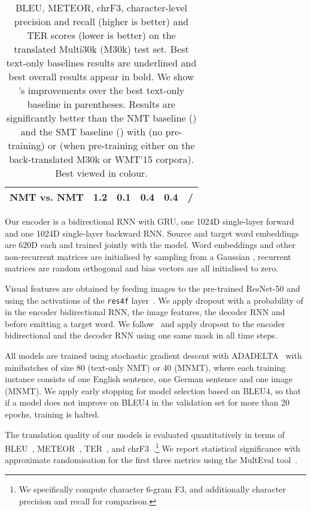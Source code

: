 \documentclass[11pt]{article}
\newcommand{\red}[1]{\textcolor{Red}{#1}}
\newcommand{\green}[1]{\textcolor{OliveGreen}{#1}}
\newcommand{\greenbf}[1]{\textbf{\textcolor{OliveGreen}{#1}}}
\begin{document}
\begin{table*}[t!]
{\begin{tabular}{lllllll}
    \multicolumn{2}{l}{\textbf{NMT vs. NMT}} &
    \greenbf{ 1.2} &
    \green{ 0.1} &
    \green{ 0.4} &
    \green{ 0.4} &
    \red{} / \green{} \\
    \bottomrule
  \end{tabular}
  }
  
  \caption{BLEU, METEOR, chrF3, character-level precision and recall (higher is better) and TER scores (lower is better) on the translated Multi30k (M30k) test set.
  Best text-only baselines results are underlined and best overall results appear in bold.
  We show 's improvements over the best text-only baseline in parentheses.
  Results are significantly better than the NMT baseline () and the SMT baseline () with  (no pre-training) or  (when pre-training either on the back-translated M30k or WMT'15 corpora). Best viewed in colour.
  }
  \label{tbl:results}
\end{table*}


Our encoder is a bidirectional RNN with GRU, one 1024D single-layer forward and one 1024D single-layer backward RNN.
Source and target word embeddings are 620D each and trained jointly with the model.
Word embeddings and other non-recurrent matrices are initialised by sampling from a Gaussian , recurrent matrices are random orthogonal and bias vectors are all initialised to zero.

Visual features are obtained by feeding images to the pre-trained
ResNet-50 and using the activations of the \texttt{res4f} layer~\cite{He2015}.
We apply dropout with a probability of  in the encoder bidirectional RNN, the image features, the decoder RNN and before emitting a target word.
We follow~ and apply dropout to the encoder bidirectional and the decoder RNN using one same mask in all time steps.

All models are trained using
stochastic gradient descent with ADADELTA~\cite{Zeiler2012} with minibatches of size 80 (text-only NMT) or 40 (MNMT), where each training instance consists of one English sentence, one German sentence and one image (MNMT).
We apply early stopping for model selection based on BLEU4, so that if a model does not improve on BLEU4 in the validation set for more than 20 epochs, training is halted.

The translation quality of our models is evaluated quantitatively in terms of BLEU~\cite{Papinenietal2002}, METEOR~\cite{DenkowskiLavie2014}, TER~\cite{Snoveretal2006}, and chrF3~\cite{Popovic2015}.\footnote{We specifically compute character 6-gram F3, and additionally character precision and recall for comparison.}
We report statistical significance with approximate randomisation for the first three metrics using the \mbox{MultEval} tool~\cite{Clarketal2011}.
\end{document}
